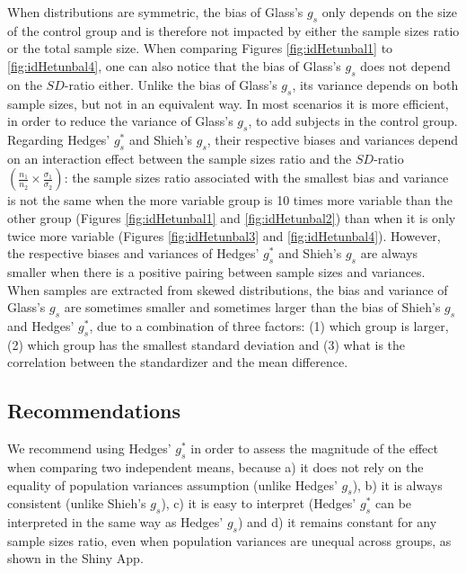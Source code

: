 \documentclass[
  english,
  man,floatsintext]{apa6}
\begin{document}
When distributions are symmetric, the bias of Glass's \(g_s\) only depends on the size of the control group and is therefore not impacted by either the sample sizes ratio or the total sample size. When comparing Figures \ref{fig:idHetunbal1} to \ref{fig:idHetunbal4}, one can also notice that the bias of Glass's \(g_s\) does not depend on the \(SD\)-ratio either. Unlike the bias of Glass's \(g_s\), its variance depends on both sample sizes, but not in an equivalent way. In most scenarios it is more efficient, in order to reduce the variance of Glass's \(g_s\), to add subjects in the control group. Regarding Hedges' \(g^*_s\) and Shieh's \(g_s\), their respective biases and variances depend on an interaction effect between the sample sizes ratio and the \(SD\)-ratio \(\left( \frac{n_1}{n_2} \times \frac{\sigma_1}{\sigma_2} \right)\): the sample sizes ratio associated with the smallest bias and variance is not the same when the more variable group is 10 times more variable than the other group (Figures \ref{fig:idHetunbal1} and \ref{fig:idHetunbal2}) than when it is only twice more variable (Figures \ref{fig:idHetunbal3} and \ref{fig:idHetunbal4}). However, the respective biases and variances of Hedges' \(g^*_s\) and Shieh's \(g_s\) are always smaller when there is a positive pairing between sample sizes and variances. When samples are extracted from skewed distributions, the bias and variance of Glass's \(g_s\) are sometimes smaller and sometimes larger than the bias of Shieh's \(g_s\) and Hedges' \(g^*_s\), due to a combination of three factors: (1) which group is larger, (2) which group has the smallest standard deviation and (3) what is the correlation between the standardizer and the mean difference.

\hypertarget{recommendations}{%
\subsection{Recommendations}\label{recommendations}}

We recommend using Hedges' \(g^*_s\) in order to assess the magnitude of the effect when comparing two independent means, because a) it does not rely on the equality of population variances assumption (unlike Hedges' \(g_s\)), b) it is always consistent (unlike Shieh's \(g_s\)), c) it is easy to interpret (Hedges' \(g^*_s\) can be interpreted in the same way as Hedges' \(g_s\)) and d) it remains constant for any sample sizes ratio, even when population variances are unequal across groups, as shown in the Shiny App.
\end{document}
